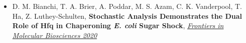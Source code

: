\documentclass[letterpaper,10pt]{article}
\makeatletter
\newcommand{\subheadingtitlevspace}{
\vspace{-3pt}
}
\newcommand{\resumeItem}[1]{
  \item{
    {#1 \vspace{-4pt}}
  }
}
\newcommand{\titleItem}[1]{
  \textbf{#1}
}
\newcommand{\resumeProjectHeading}[2]{
    \item
    \begin{tabular*}{0.97\textwidth}{l@{\extracolsep{\fill}}r}
      #1 & \textit{ #2} \\
    \end{tabular*}\vspace{-9pt}
}
\newcommand{\resumeSubHeadingListStart}{\subheadingtitlevspace\begin{itemize}[leftmargin=0.15in, label={}]}
\newcommand{\resumeSubHeadingListEnd}{\end{itemize}}
\newcommand{\resumeItemListStart}{
\begin{itemize}}
\newcommand{\resumeItemListEnd}{
\end{itemize}\vspace{-8pt}}
\makeatother
\begin{document}
\begin{itemize}[leftmargin=0.35in, label={}, labelindent=5pt,itemindent=-15pt]
\item D. M. Bianchi, \textcolor{color1}{T. A. Brier}, A. Poddar, M. S. Azam, C. K. Vanderpool, T. Ha, Z. Luthey-Schulten, \textbf{Stochastic Analysis Demonstrates the Dual Role of Hfq in Chaperoning \textit{E. coli} Sugar Shock}, \href{https://doi.org/10.3389/fmolb.2020.593826}{\textit{Frontiers in Molecular Biosciences 2020}}%

\end{itemize}



\end{document}
